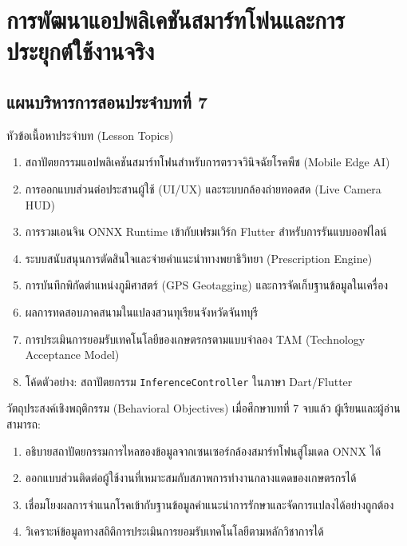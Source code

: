 \chapter{การพัฒนาแอปพลิเคชันสมาร์ทโฟนและการประยุกต์ใช้งานจริง}
\label{chap:mobile_application}

\section*{แผนบริหารการสอนประจำบทที่ 7}

\begin{planbox}{หัวข้อเนื้อหาประจำบท (Lesson Topics)}
\begin{enumerate}[leftmargin=1.5em, itemsep=2pt]
    \item สถาปัตยกรรมแอปพลิเคชันสมาร์ทโฟนสำหรับการตรวจวินิจฉัยโรคพืช (Mobile Edge AI)
    \item การออกแบบส่วนต่อประสานผู้ใช้ (UI/UX) และระบบกล้องถ่ายทอดสด (Live Camera HUD)
    \item การรวมเอนจิน ONNX Runtime เข้ากับเฟรมเวิร์ก Flutter สำหรับการรันแบบออฟไลน์
    \item ระบบสนับสนุนการตัดสินใจและจ่ายคำแนะนำทางพยาธิวิทยา (Prescription Engine)
    \item การบันทึกพิกัดตำแหน่งภูมิศาสตร์ (GPS Geotagging) และการจัดเก็บฐานข้อมูลในเครื่อง
    \item ผลการทดสอบภาคสนามในแปลงสวนทุเรียนจังหวัดจันทบุรี
    \item การประเมินการยอมรับเทคโนโลยีของเกษตรกรตามแบบจำลอง TAM (Technology Acceptance Model)
    \item โค้ดตัวอย่าง: สถาปัตยกรรม \texttt{InferenceController} ในภาษา Dart/Flutter
\end{enumerate}
\end{planbox}

\begin{planbox}{วัตถุประสงค์เชิงพฤติกรรม (Behavioral Objectives)}
เมื่อศึกษาบทที่ 7 จบแล้ว ผู้เรียนและผู้อ่านสามารถ:
\begin{enumerate}[leftmargin=1.5em, itemsep=2pt]
    \item อธิบายสถาปัตยกรรมการไหลของข้อมูลจากเซนเซอร์กล้องสมาร์ทโฟนสู่โมเดล ONNX ได้
    \item ออกแบบส่วนติดต่อผู้ใช้งานที่เหมาะสมกับสภาพการทำงานกลางแดดของเกษตรกรได้
    \item เชื่อมโยงผลการจำแนกโรคเข้ากับฐานข้อมูลคำแนะนำการรักษาและจัดการแปลงได้อย่างถูกต้อง
    \item วิเคราะห์ข้อมูลทางสถิติการประเมินการยอมรับเทคโนโลยีตามหลักวิชาการได้
\end{enumerate}
\end{planbox}

